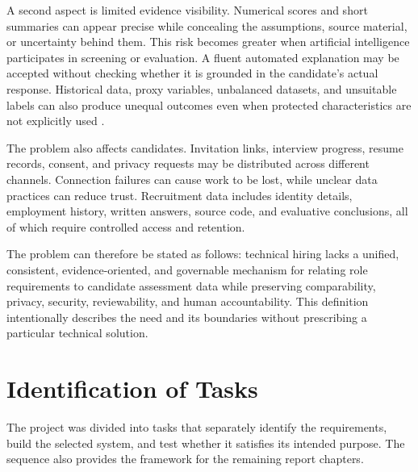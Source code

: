 \documentclass[12pt,a4paper,oneside]{report}
\renewcommand{\cite}[1]{}
\begin{document}
A second aspect is limited evidence visibility. Numerical scores and short summaries
can appear precise while concealing the assumptions, source material, or uncertainty
behind them. This risk becomes greater when artificial intelligence participates in
screening or evaluation. A fluent automated explanation may be accepted without
checking whether it is grounded in the candidate's actual response. Historical data,
proxy variables, unbalanced datasets, and unsuitable labels can also produce unequal
outcomes even when protected characteristics are not explicitly used
\cite{kochling2020,raghavan2020}.

The problem also affects candidates. Invitation links, interview progress, resume
records, consent, and privacy requests may be distributed across different channels.
Connection failures can cause work to be lost, while unclear data practices can reduce
trust. Recruitment data includes identity details, employment history, written
answers, source code, and evaluative conclusions, all of which require controlled
access and retention.

The problem can therefore be stated as follows: technical hiring lacks a unified,
consistent, evidence-oriented, and governable mechanism for relating role requirements
to candidate assessment data while preserving comparability, privacy, security,
reviewability, and human accountability. This definition intentionally describes the
need and its boundaries without prescribing a particular technical solution.

\clearpage
\section{Identification of Tasks}

The project was divided into tasks that separately identify the requirements, build
the selected system, and test whether it satisfies its intended purpose. The sequence
also provides the framework for the remaining report chapters.
\end{document}
